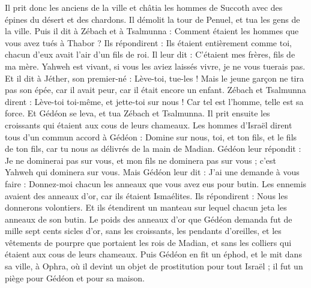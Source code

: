 \begin{multicols}{2}
Il prit donc les anciens de la ville et châtia les hommes de Succoth avec des épines du désert et des chardons.
Il démolit la tour de Penuel, et tua les gens de la ville.
Puis il dit à Zébach et à Tsalmunna : Comment étaient les hommes que vous avez tués à Thabor ? Ils répondirent : Ils étaient entièrement comme toi, chacun d'eux avait l'air d'un fils de roi.
Il leur dit : C'étaient mes frères, fils de ma mère. Yahweh est vivant, si vous les aviez laissés vivre, je ne vous tuerais pas.
Et il dit à Jéther, son premier-né : Lève-toi, tue-les ! Mais le jeune garçon ne tira pas son épée, car il avait peur, car il était encore un enfant.
Zébach et Tsalmunna dirent : Lève-toi toi-même, et jette-toi sur nous ! Car tel est l'homme, telle est sa force. Et Gédéon se leva, et tua Zébach et Tsalmunna. Il prit ensuite les croissants qui étaient aux cous de leurs chameaux.
Les hommes d'Israël dirent tous d'un commun accord à Gédéon : Domine sur nous, toi, et ton fils, et le fils de ton fils, car tu nous as délivrés de la main de Madian.
Gédéon leur répondit : Je ne dominerai pas sur vous, et mon fils ne dominera pas sur vous ; c'est Yahweh qui dominera sur vous.
Mais Gédéon leur dit : J’ai une demande à vous faire : Donnez-moi chacun les anneaux que vous avez eus pour butin. Les ennemis avaient des anneaux d'or, car ils étaient Ismaélites.
Ils répondirent : Nous les donnerons volontiers. Et ils étendirent un manteau sur lequel chacun jeta les anneaux de son butin.
Le poids des anneaux d'or que Gédéon demanda fut de mille sept cents sicles d'or, sans les croissants, les pendants d'oreilles, et les vêtements de pourpre que portaient les rois de Madian, et sans les colliers qui étaient aux cous de leurs chameaux.
Puis Gédéon en fit un  éphod, et le mit dans sa ville, à Ophra, où il devint un objet de prostitution pour tout Israël ; il fut un piège pour Gédéon et pour sa maison.

\end{multicols}
